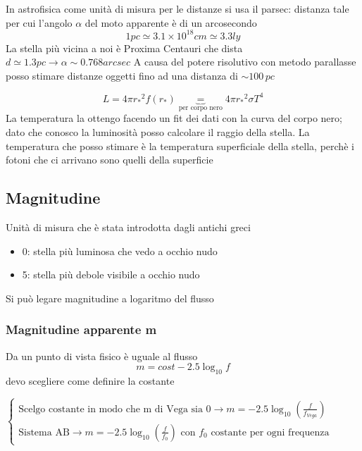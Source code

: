 \documentclass[a4paper,11pt]{report}
\theoremstyle{remark}
\theoremstyle{definition}
\begin{document}
\noindent In astrofisica come unità di misura per le distanze si usa il parsec: distanza tale per cui l'angolo $\alpha$ del moto apparente è di un arcosecondo
\begin{equation*}
    1 pc \simeq 3.1 \times 10^{18} cm \simeq 3.3 ly
\end{equation*}
La stella più vicina a noi è Proxima Centauri che dista $d \simeq 1.3 pc \rightarrow \alpha \sim 0.768 arcsec$ \newline
A causa del potere risolutivo con metodo parallasse posso stimare distanze oggetti fino ad una distanza di $\sim 100 \, pc$   

\begin{equation*}
    L =4\pi {r_*}^2 f(r_*) \underbrace{=}_{\text{per corpo nero}} 4\pi {r_*}^2 \sigma T^4
\end{equation*}
La temperatura la ottengo facendo un fit dei dati con la curva del corpo nero; dato che conosco la luminosità posso calcolare il raggio della stella. La temperatura che posso stimare è la temperatura superficiale della stella, perchè i fotoni che ci arrivano sono quelli della superficie

\subsection*{Magnitudine}
Unità di misura che è stata introdotta dagli antichi greci
\begin{itemize}
    \item 0: stella più luminosa che vedo a occhio nudo
    \item 5: stella più debole visibile a occhio nudo
\end{itemize}
Si può legare magnitudine a logaritmo del flusso

\subsubsection*{Magnitudine apparente m}
Da un punto di vista fisico è uguale al flusso
\begin{equation*}
    m = cost - 2.5 \log_{10}f
\end{equation*}
devo scegliere come definire la costante \newline

\noindent $\begin{cases}
    \text{Scelgo costante in modo che m di Vega sia 0} \rightarrow m = -2.5 \log_{10}\left(\frac{f}{f_{Vega}}\right) \\
    \text{Sistema AB} \rightarrow m = -2.5 \log_{10}\left(\frac{f}{f_0}\right) \text{ con $f_0$ costante per ogni frequenza}
\end{cases}$
\end{document}

